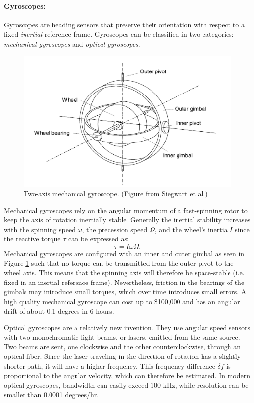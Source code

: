 \paragraph{Gyroscopes:} Gyroscopes are heading sensors that preserve their orientation with respect to a fixed \textit{inertial} reference frame. Gyroscopes can be classified in two categories: \textit{mechanical gyroscopes} and \textit{optical gyroscopes}.
\begin{figure}[ht]
\centering
        \includegraphics[width=.7\textwidth]{tex/figs/ch08_figs/gyro.png}
        \caption{Two-axis mechanical gyroscope. (Figure from Siegwart et al.) \nocite{SiegwartNourbakhshEtAl2011}}
        \label{fig:gyro}
\end{figure}
Mechanical gyroscopes rely on the angular momentum of a fast-spinning rotor to keep the axis of rotation inertially stable. Generally the inertial stability increases with the spinning speed $\omega$, the precession speed $\Omega$, and the wheel’s inertia $I$ since the reactive torque $\tau$ can be expressed as:
\begin{equation*}
    \tau = I \omega \Omega.
\end{equation*}
Mechanical gyroscopes are configured with an inner and outer gimbal as seen in Figure \ref{fig:gyro} such that no torque can be transmitted from the outer pivot to the wheel axis. This means that the spinning axis will therefore be space-stable (i.e. fixed in an inertial reference frame). Nevertheless, friction in the bearings of the gimbals may introduce small torques, which over time introduces small errors. A high quality mechanical gyroscope can cost up to \$100,000
and has an angular drift of about 0.1 degrees in 6 hours.

Optical gyroscopes are a relatively new invention. They use angular speed sensors with two monochromatic light beams, or lasers, emitted from the same source. Two beams are sent, one clockwise and the other counterclockwise, through an optical fiber. Since the laser traveling in the direction of rotation has a slightly shorter path, it will have a higher frequency. This frequency difference $\delta f$ is proportional to the angular velocity, which can therefore be estimated. In modern optical gyroscopes, bandwidth can easily exceed 100 kHz, while resolution can be smaller than 0.0001 degrees/hr.

